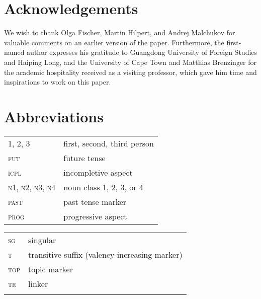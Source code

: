 \documentclass[output=paper]{langsci/langscibook}
\begin{document}
\section*{Acknowledgements}



We wish to thank Olga Fischer, Martin Hilpert, and Andrej Malchukov for valuable comments on an earlier version of the paper. Furthermore, the first-named author expresses his gratitude to Guangdong University of Foreign Studies and Haiping Long, and the University of Cape Town and Matthias Brenzinger for the academic hospitality received as a visiting professor, which gave him time and inspirations to work on this paper.



\section*{Abbreviations}
\begin{tabularx}{.55\textwidth}{@{}lQ@{}} 
1, 2, 3 & first, second, third person\\
 \textsc{fut} & {future tense}\\
 \textsc{icpl} & {incompletive} aspect\\
 \textsc{n1}, \textsc{n2}, \textsc{n3}, \textsc{n4} & noun class 1, 2, 3, or 4\\
 \textsc{past} & past tense marker\\
 \textsc{prog} & {progressive aspect}\\
\end{tabularx}
\begin{tabularx}{.45\textwidth}{@{}lQ@{}} 
 \textsc{sg} & singular\\
 \textsc{t} & {transitive} suffix (valency-increasing marker)\\
 \textsc{top} & topic marker\\
 \textsc{tr} & linker\\
  & \\
\end{tabularx}



{\sloppy
\printbibliography[heading=subbibliography,notkeyword=this]
}
\end{document}

